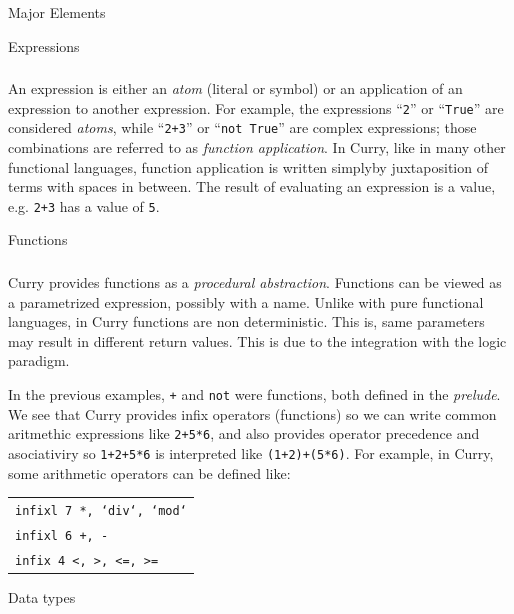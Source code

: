 \documentclass{beamer}
\newcommand{\q}[1]{\texttt{#1}}
\begin{document}
\begin{section}{Major Elements}


  \begin{subsection}{Expressions}
    \begin{frame}
      \frametitle{\subsecname}
      An expression is either an \textit{atom} (literal or symbol) or
      an        application
      of an expression to another expression. For example, the
      expressions
      ``\q{2}'' or ``\q{True}'' are considered \textit{atoms}, while
      ``\q{2+3}'' or ``\q{not True}'' are complex expressions; those
      combinations are referred to as \textit{function application}.
      In Curry,        like in
      many other functional languages, function application is written
      simplyby juxtaposition of terms with spaces in between. The result of evaluating an expression is a value, e.g. \q{2+3} has a value of \q{5}.
    \end{frame}
  \end{subsection}


  \begin{subsection}{Functions}
    \begin{frame}
      \frametitle{\subsecname}
      Curry provides functions as a \textit{procedural abstraction}.
      Functions can be viewed as a parametrized expression, possibly
      with a name.
      Unlike with pure functional languages, in Curry functions are
      non deterministic. This is, same parameters may result in different
      return        values.
      This is due to the integration with the logic paradigm.
    \end{frame}
    \begin{frame}
      In the previous examples, \q{+} and \q{not} were
      functions, both        defined        in
      the \textit{prelude}. We see that Curry provides infix
      operators                (functions) so
      we can write common aritmethic expressions like
      \q{2+5*6}, and        also        provides
      operator precedence and asociativiry so \q{1+2+5*6} is
      interpreted like
      \q{(1+2)+(5*6)}. For example, in Curry, some arithmetic
      operators can be
      defined like:\\
      \begin{tabular}[c]{l}
        \\
        \q{infixl 7 *, ‘div‘, ‘mod‘}\\
        \q{infixl 6 +, -}\\
        \q{infix 4 <, >, <=, >=}
      \end{tabular}
    \end{frame}
  \end{subsection}
  \begin{subsection}{Data types}
    

\end{subsection}
\end{section}
\end{document}
